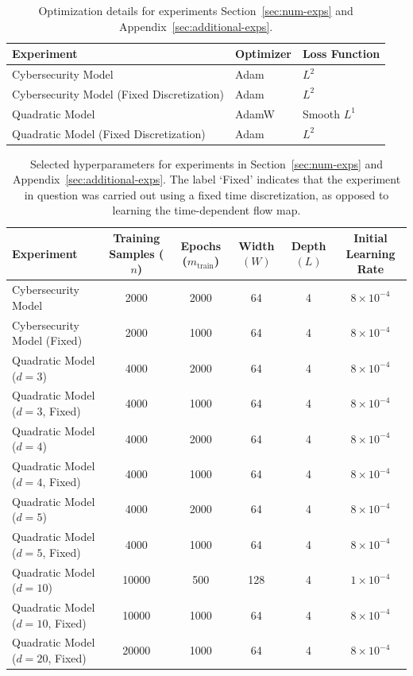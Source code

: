 \documentclass[11pt,reqno]{amsart}
\numberwithin{equation}{section}
\theoremstyle{plain}
\newcommand{\1}{\boldsymbol{\mathbbm{1}}}
\begin{document}
\begin{table}[h]
\centering
\caption{Optimization details for experiments Section~\ref{sec:num-exps} and Appendix~\ref{sec:additional-exps}.}
\label{tab:optimizers}
\begin{tabular}{lll}
\hline
\textbf{Experiment} &
\textbf{Optimizer} &
\textbf{Loss Function} \\
\hline
Cybersecurity Model & Adam & $L^2$ \\ 
Cybersecurity Model (Fixed Discretization) & Adam & $L^2$ \\ 
Quadratic Model & AdamW & Smooth $L^1$ \\ 
Quadratic Model (Fixed Discretization) & Adam & $L^2$ \\ 
\hline
\end{tabular}
\end{table}

\begin{table}[h]
\tiny
\centering
\caption{Selected hyperparameters for experiments in Section~\ref{sec:num-exps} and Appendix~\ref{sec:additional-exps}. The label `Fixed' indicates that the experiment in question was carried out using a fixed time discretization, as opposed to learning the time-dependent flow map.}
\label{tab:hyperparams}
\begin{tabular}{lccccc}
\hline
\textbf{Experiment} &
\textbf{Training Samples ($n$)} &
\textbf{Epochs ($m_{\textrm{train}}$)} &
\textbf{Width $(W)$} &
\textbf{Depth $(L)$} &
\textbf{Initial Learning Rate}\\
\hline
Cybersecurity Model & 2000 & 2000 & 64 & 4 & $8 \times 10^{-4}$ \\
Cybersecurity Model (Fixed) & 2000 & 1000 & 64 & 4 & $8 \times 10^{-4}$ \\
Quadratic Model ($d = 3$) & 4000 & 2000 & 64 & 4 & $8 \times 10^{-4}$ \\
Quadratic Model ($d = 3$, Fixed) & 4000 & 1000 & 64 & 4 & $8 \times 10^{-4}$ \\
Quadratic Model ($d = 4$) & 4000 & 2000 & 64 & 4 & $8 \times 10^{-4}$ \\
Quadratic Model ($d = 4$, Fixed) & 4000 & 1000 & 64 & 4 & $8 \times 10^{-4}$ \\
Quadratic Model ($d = 5$) & 4000 & 2000 & 64 & 4 & $8 \times 10^{-4}$ \\
Quadratic Model ($d = 5$, Fixed) & 4000 & 1000 & 64 & 4 & $8 \times 10^{-4}$ \\
Quadratic Model ($d = 10$) & 10000 & 500 & 128 & 4 & $1 \times 10^{-4}$ \\
Quadratic Model ($d = 10$, Fixed) & 10000 & 1000 & 64 & 4 & $8 \times 10^{-4}$ \\
Quadratic Model ($d = 20$, Fixed) & 20000 & 1000 & 64 & 4 & $8 \times 10^{-4}$ \\
\hline
\end{tabular}
\end{table}
\end{document}
